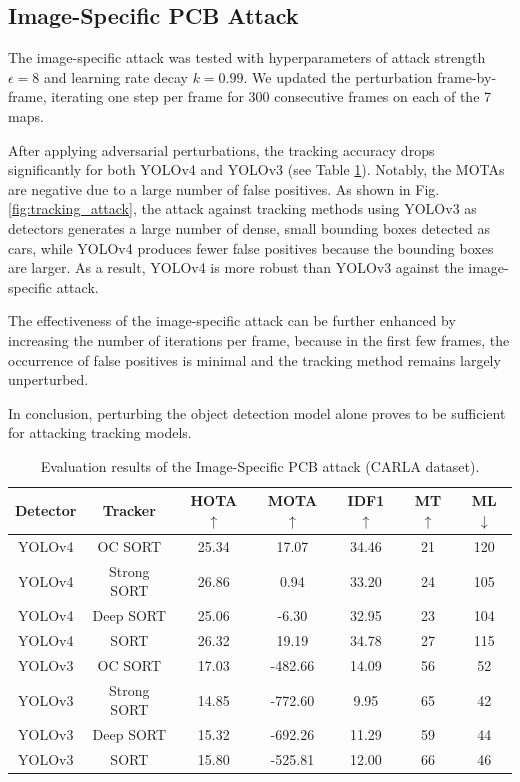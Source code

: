 \vfill
\clearpage

\subsection{Image-Specific PCB Attack}

The image-specific attack was tested with hyperparameters of attack strength $\epsilon=8$ and learning rate decay $k=0.99$. We updated the perturbation frame-by-frame, iterating one step per frame for 300 consecutive frames on each of the 7 maps.

After applying adversarial perturbations, the tracking accuracy drops significantly for both YOLOv4 and YOLOv3 (see Table \ref{tab.carla_pcb}). Notably, the MOTAs are negative due to a large number of false positives. As shown in Fig. \ref{fig:tracking_attack}, the attack against tracking methods using YOLOv3 as detectors generates a large number of dense, small bounding boxes detected as cars, while YOLOv4 produces fewer false positives because the bounding boxes are larger. As a result, YOLOv4 is more robust than YOLOv3 against the image-specific attack.

The effectiveness of the image-specific attack can be further enhanced by increasing the number of iterations per frame, because in the first few frames, the occurrence of false positives is minimal and the tracking method remains largely unperturbed. 

In conclusion, perturbing the object detection model alone proves to be sufficient for attacking tracking models.


\begin{table}[H]
\centering
\begin{tabular}{ ccccccc } 
\hline
Detector & Tracker & HOTA $\uparrow$ & MOTA $\uparrow$ & IDF1 $\uparrow$ & MT $\uparrow$ & ML $\downarrow$ \\
\hline
YOLOv4 & OC SORT      &  25.34 &  17.07  &  34.46  &  21  &  120  \\
YOLOv4 & Strong SORT  &  26.86  &  0.94  &  33.20  &  24  & 105 \\ 
YOLOv4 & Deep SORT    &  25.06 &  -6.30  &  32.95  &  23 
 &  104  \\ 
YOLOv4 & SORT         &  26.32  &  19.19  &  34.78  &  27  &  115  \\ 
\hline
YOLOv3 & OC SORT      &  17.03 &  -482.66  &  14.09  &  56  &  52  \\
YOLOv3 & Strong SORT  &  14.85  &  -772.60  &  9.95  &  65 &  42 \\ 
YOLOv3 & Deep SORT    &  15.32  &  -692.26  &  11.29  &  59  &  44  \\ 
YOLOv3 & SORT         &  15.80  &  -525.81  &  12.00  &  66  &  46  \\ 
\hline
\end{tabular}
\caption{Evaluation results of the Image-Specific PCB attack (CARLA dataset).}
\label{tab.carla_pcb}
\end{table}

